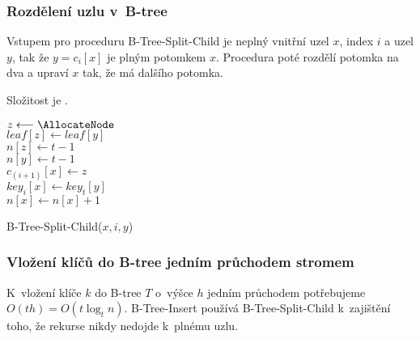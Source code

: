 \subsubsection{Rozdělení uzlu v~B-tree}

Vstupem pro proceduru B-Tree-Split-Child je neplný vnitřní uzel $x$,
index $i$ a uzel $y$, tak že $y=c_{i}[x]$ je plným potomkem $x$\@.
Procedura poté rozdělí potomka na dva a upraví $x$ tak, že má dalšího
potomka.

Složitost je .

%

\begin{algorithm}[t]
\SetAlgoLined
{}

{$z \longleftarrow \AllocateNode$}\\
{$leaf[z] \longleftarrow leaf[y]$}\\
{$n[z] \longleftarrow t-1$}\\
$n[y] \longleftarrow t-1$\\
$c_{(i+1)}[x] \longleftarrow z$\\
$key_i[x] \longleftarrow key_t[y]$\\
$n[x] \longleftarrow n[x]+1$
\caption{B-Tree-Split-Child($x, i, y$)}
\end{algorithm}



\subsubsection{Vložení klíčů do B-tree jedním průchodem stromem}

K~vložení klíče $k$ do B-tree $T$ o~výšce $h$ jedním průchodem
potřebujeme $O(th)=O(t\log_{t}n)$\@. B-Tree-Insert používá B-Tree-Split-Child
k~zajištění toho, že rekurse nikdy nedojde k~plnému uzlu\@.


